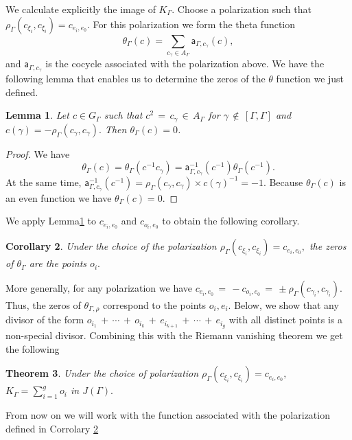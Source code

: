 \documentclass[]{amsart}
\numberwithin{equation}{section}
\newtheorem{theorem}{Theorem}[section]
\newtheorem{lemma}[theorem]{Lemma}
\newtheorem{corollary}[theorem]{Corollary}
\newcommand{\sfa}{\mathsf{a}}
\begin{document}
We calculate explicitly the image of $K_{\Gamma}$. Choose a polarization such that $\rho_{\Gamma}(c_{\xi_i},c_{\xi_i})=c_{e_i,e_0}.$ For this polarization we form the theta function
\begin{equation} 
\theta_{\Gamma}(c) = \sum_{c_\gamma\in A_{\Gamma}}\sfa_{\Gamma,c_\gamma}(c),
\end{equation}
and $\sfa_{\Gamma,c_\gamma}$ is the cocycle associated with the polarization above. 
We have the following lemma that enables us to determine the zeros of the $\theta$ function we just defined. 
\begin{lemma}\label{coollemma} 
Let $c \in G_{\Gamma}$ such that  $c^2\,{=}\,c_\gamma \,{\in}\, A_{\Gamma}$ 
for $\gamma\,{\not\in}\, [\Gamma,\Gamma]$ and 
$c(\gamma)=-\rho_{\Gamma}(c_\gamma,c_\gamma).$ Then $\theta_{\Gamma}(c)=0$.
\end{lemma}
\begin{proof}
We have 
\begin{equation}
\theta_{\Gamma}(c)=\theta_{\Gamma}(c^{-1}c_\gamma)
= \sfa^{-1}_{\Gamma,c_\gamma}(c^{-1})\theta_{\Gamma}(c^{-1}).
\end{equation}  
At the same time, $\sfa^{-1}_{\Gamma,c_\gamma}(c^{-1})
= \rho_{\Gamma} (c_\gamma,c_\gamma)\times c(\gamma)^{-1}=-1$. 
Because $\theta_{\Gamma}(c)$ is an even function  we have  $\theta_{\Gamma}(c)=0$.
\end{proof} 
We apply Lemma\;\ref{coollemma} to $c_{e_i, e_0}$ and $c_{o_i, e_0}$ to obtain the following corollary.
\begin{corollary}\label{polarizationchoice}
Under the choice of the polarization $\rho_{\Gamma}(c_{\xi_i},c_{\xi_i})=c_{e_i, e_0},$ the zeros of  $\theta_{\Gamma}$ are the points $o_i.$
\end{corollary}
More generally, for any polarization we have $c_{e_i, e_0}\,{=}\,{-}c_{o_i, e_0}\,{=}\,{\pm} \rho_{\Gamma}\left(c_{\gamma_i},c_{\gamma_i}\right)$. Thus, the zeros of $\theta_{\Gamma,\rho}$ correspond to the points $o_i, e_i.$
Below, we  show that any divisor of the form $o_{i_1}\,{+}\, \cdots \,{+}\,o_{i_k}\,{+}\,e_{i_{k+1}}\,{+}\,\cdots \,{+}\,e_{i_g}$ with all distinct points is a non-special divisor. Combining this with the Riemann vanishing theorem we get the following 
\begin{theorem} 
Under the choice of polarization $\rho_{\Gamma}(c_{\xi_i},c_{\xi_i})=c_{e_i,e_0}, $  $K_{\Gamma}=\sum_{i=1}^g o_i$ in $J(\Gamma).$ 
\end{theorem} 
From now on we will work with the function associated with the polarization defined in Corrolary \ref{polarizationchoice}
\end{document}
